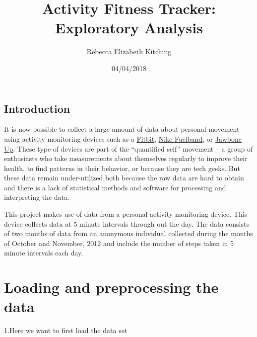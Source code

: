 \documentclass[]{article}
\title{Activity Fitness Tracker: Exploratory Analysis}
\author{Rebecca Elizabeth Kitching}
\date{04/04/2018}
\newenvironment{Shaded}{\begin{snugshade}}{\end{snugshade}}
\newcommand{\KeywordTok}[1]{\textcolor[rgb]{0.13,0.29,0.53}{\textbf{{#1}}}}
\newcommand{\DataTypeTok}[1]{\textcolor[rgb]{0.13,0.29,0.53}{{#1}}}
\newcommand{\DecValTok}[1]{\textcolor[rgb]{0.00,0.00,0.81}{{#1}}}
\newcommand{\StringTok}[1]{\textcolor[rgb]{0.31,0.60,0.02}{{#1}}}
\newcommand{\CommentTok}[1]{\textcolor[rgb]{0.56,0.35,0.01}{\textit{{#1}}}}
\newcommand{\NormalTok}[1]{{#1}}
\begin{document}
\maketitle

\subsection{Introduction}\label{introduction}

It is now possible to collect a large amount of data about personal
movement using activity monitoring devices such as a
\href{http://www.fitbit.com}{Fitbit},
\href{http://www.nike.com/us/en_us/c/nikeplus-fuelband}{Nike Fuelband},
or \href{https://jawbone.com/up}{Jawbone Up}. These type of devices are
part of the ``quantified self'' movement -- a group of enthusiasts who
take measurements about themselves regularly to improve their health, to
find patterns in their behavior, or because they are tech geeks. But
these data remain under-utilized both because the raw data are hard to
obtain and there is a lack of statistical methods and software for
processing and interpreting the data.

This project makes use of data from a personal activity monitoring
device. This device collects data at 5 minute intervals through out the
day. The data consists of two months of data from an anonymous
individual collected during the months of October and November, 2012 and
include the number of steps taken in 5 minute intervals each day.

\section{Loading and preprocessing the
data}\label{loading-and-preprocessing-the-data}

1.Here we want to first load the data set

\begin{Shaded}
\end{Shaded}
\end{document}
